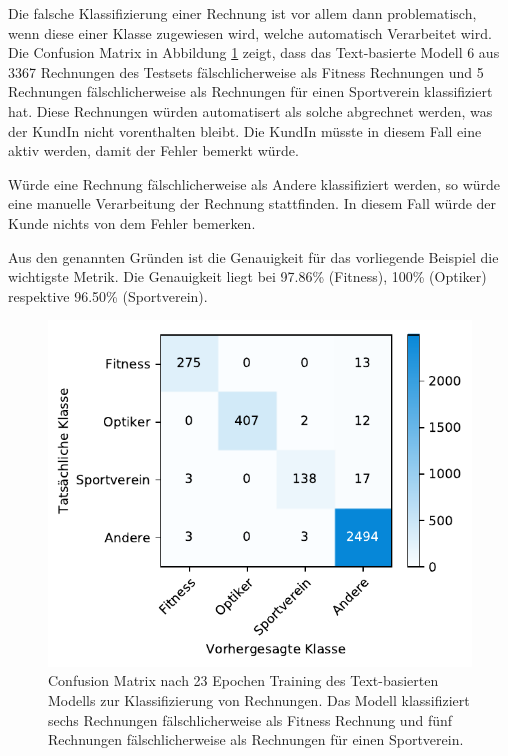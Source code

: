 Die falsche Klassifizierung einer Rechnung ist vor allem dann problematisch, wenn diese einer Klasse zugewiesen wird, welche automatisch Verarbeitet wird. Die Confusion Matrix in Abbildung \ref{text-classification-cm} zeigt, dass das Text-basierte Modell 6 aus 3367 Rechnungen des Testsets fälschlicherweise als Fitness Rechnungen und 5 Rechnungen fälschlicherweise als Rechnungen für einen Sportverein klassifiziert hat. Diese Rechnungen würden automatisert als solche abgrechnet werden, was der KundIn nicht vorenthalten bleibt. Die KundIn müsste in diesem Fall eine aktiv werden, damit der Fehler bemerkt würde.

Würde eine Rechnung fälschlicherweise als Andere klassifiziert werden, so würde eine manuelle Verarbeitung der Rechnung stattfinden. In diesem Fall würde der Kunde nichts von dem Fehler bemerken. 

Aus den genannten Gründen ist die Genauigkeit für das vorliegende Beispiel die wichtigste Metrik. Die Genauigkeit liegt bei 97.86\% (Fitness), 100\% (Optiker) respektive 96.50\% (Sportverein).

\begin{figure}[h!] 
    \captionsetup{width=.9\linewidth}
    \caption[Confusion Matrix des Text-basierten Modells zur Klassifizierung von Rechnungen]{Confusion Matrix nach 23 Epochen Training des Text-basierten Modells zur Klassifizierung von Rechnungen. Das Modell klassifiziert sechs Rechnungen fälschlicherweise als Fitness Rechnung und fünf Rechnungen fälschlicherweise als Rechnungen für einen Sportverein.}
    \label{text-classification-cm}
    \centering
    \includegraphics[scale=1]{graphics/matplot/textual-class__cm_22.pdf}
\end{figure}

